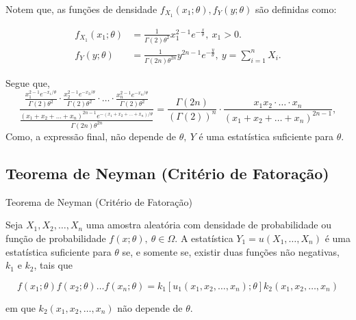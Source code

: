 \documentclass[12pt]{beamer}
\begin{document}
\begin{frame}{}
\begin{block}{}
\justifying
Notem que, as funções de densidade $f_{X_{1}}(x_{1};\theta), f_{Y}(y;\theta)$ são definidas como:

\begin{align*}
f_{X_{1}}(x_{1};\theta) &= 
\frac{1}{\Gamma(2)\theta^{2}}x_1^{2-1}e^{-\frac{x}{\theta}},~x_{1}>0.\\
f_{Y}(y;\theta) &= 
\frac{1}{\Gamma(2n)\theta^{2n}}y^{2n-1}e^{-\frac{y}{\theta}}, ~y={\displaystyle \sum_{i=1}^{n}X_{i}}.
\end{align*}
\end{block}
\end{frame}

\begin{frame}{}
\begin{block}{}
\justifying
Segue que,
\begin{equation*}
\dfrac{\frac{x_1^{2-1}e^{-x_1/\theta}}{\Gamma(2)\theta^2} \cdot \frac{x_2^{2-1}e^{-x_2/\theta}}{\Gamma(2)\theta^2} \cdot \ldots \cdot \frac{x_n^{2-1}e^{-x_n/\theta}}{\Gamma(2)\theta^2}}{\frac{(x_1 + x_2 + \ldots + x_n)^{2n-1}e^{-(x_1+x_2+\ldots+x_n)/\theta}}{\Gamma(2n)\theta^{2n}}}=\frac{\Gamma(2n)}{(\Gamma(2))^n} \cdot \frac{x_1x_2\cdot\ldots\cdot x_n}{(x_1 + x_2 + \ldots + x_n)^{2n-1}},
\end{equation*}
Como, a expressão final, não depende de $\theta,~Y$ é uma estatística suficiente para $\theta.$ 
\end{block}
\end{frame}

\subsection{Teorema de Neyman (Critério de Fatoração)}
\begin{frame}{Teorema de Neyman (Critério de Fatoração)}
\begin{block}{}
\begin{Teorema}
\justifying
    Seja $X_1, X_2, \ldots, X_n$ uma amostra aleatória com densidade de probabilidade ou função de probabilidade $f(x; \theta), ~\theta \in \Omega$. A estatística $Y_1 = u(X_1, \ldots, X_n)$ é uma estatística suficiente para $\theta$ se, e somente se, existir duas funções não negativas, $k_1$ e $k_2$, tais que

\begin{equation*}
f(x_1; \theta)f(x_2; \theta) \ldots f(x_n; \theta) = k_1[u_1(x_1, x_2, \ldots, x_n); \theta]k_2(x_1, x_2, \ldots, x_n)
\end{equation*}

em que $k_2(x_1, x_2, \ldots, x_n)$ não depende de $\theta$.
\end{Teorema}
\end{block}
\end{frame}
\end{document}
